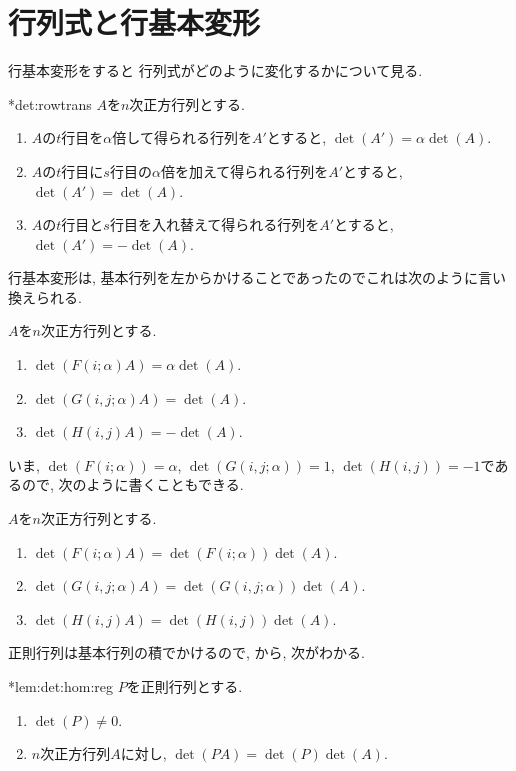 \section{行列式と行基本変形}
行基本変形をすると
行列式がどのように変化するかについて見る.
\begin{theorem}
  \provelater**{det:rowtrans}
  $A$を$n$次正方行列とする.
  \begin{enumerate}
  \item 
    $A$の$t$行目を$\alpha$倍して得られる行列を$A'$とすると,
    $\det(A')=\alpha \det(A)$.
  \item 
    $A$の$t$行目に$s$行目の$\alpha$倍を加えて得られる行列を$A'$とすると,
    $\det(A')=\det(A)$.
  \item 
    $A$の$t$行目と$s$行目を入れ替えて得られる行列を$A'$とすると,
    $\det(A')=-\det(A)$.
  \end{enumerate}
\end{theorem}


行基本変形は, 基本行列を左からかけることであったのでこれは次のように言い換えられる.
\begin{lemma}
  $A$を$n$次正方行列とする.
  \begin{enumerate}
  \item 
    $\det(F(i;\alpha)A)=\alpha \det(A)$.
  \item 
    $\det(G(i,j;\alpha)A)=\det(A)$.
  \item 
    $\det(H(i,j)A)=-\det(A)$.
  \end{enumerate}
\end{lemma}
いま,
$\det(F(i;\alpha))=\alpha$,
$\det(G(i,j;\alpha))=1$,
$\det(H(i,j))=-1$であるので,
次のように書くこともできる.
\begin{lemma}
  \label{lem:det:hom:fund}
  $A$を$n$次正方行列とする.
  \begin{enumerate}
  \item 
    $\det(F(i;\alpha)A)=\det(F(i;\alpha)) \det(A)$.
  \item 
    $\det(G(i,j;\alpha)A)=\det(G(i,j;\alpha)) \det(A)$.
  \item 
    $\det(H(i,j)A)=\det(H(i,j))\det(A)$.
  \end{enumerate}
\end{lemma}
正則行列は基本行列の積でかけるので,
から, 次がわかる.
\begin{lemma}
  \provelater**{lem:det:hom:reg}
  \label{lem:det:hom:reg}
  $P$を正則行列とする.
  \begin{enumerate}
  \item
    $\det(P)\neq 0$.
  \item
    $n$次正方行列$A$に対し, $\det(PA)=\det(P)\det(A)$.
  \end{enumerate}
\end{lemma}



